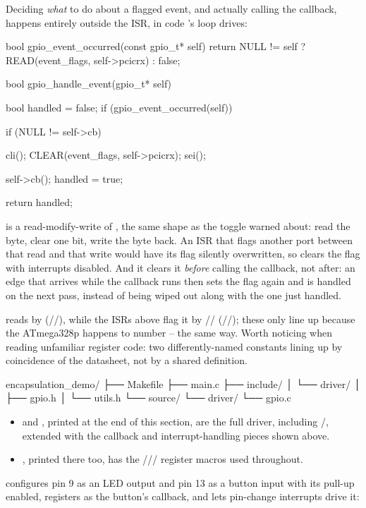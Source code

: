 \noindent Deciding \emph{what} to do about a flagged event, and actually calling the callback,
happens entirely outside the ISR, in code 's loop drives:

\begin{ccode}
bool gpio_event_occurred(const gpio_t* self)
{
    return NULL != self ? READ(event_flags, self->pcicrx) : false;
}

bool gpio_handle_event(gpio_t* self)
{
    bool handled = false;
    if (gpio_event_occurred(self))
    {
        if (NULL != self->cb)
        {
            cli();
            CLEAR(event_flags, self->pcicrx);
            sei();

            self->cb();
            handled = true;
        }
    }
    return handled;
}
\end{ccode}

\noindent{} is a read-modify-write of , the same shape as the
 toggle  warned about: read the byte, clear one bit, write the byte
back. An ISR that flags another port between that read and that write would have its flag silently
overwritten, so  clears the flag with interrupts disabled. And it clears
it \emph{before} calling the callback, not after: an edge that arrives while the callback runs then
sets the flag again and is handled on the next pass, instead of being wiped out along with the one
just handled.

 reads  by 
(//), while the ISRs above flag it by
// (//); these only line up because
the ATmega328p happens to number -- the same way. Worth noticing when
reading unfamiliar register code: two differently-named constants lining up by coincidence of the
datasheet, not by a shared definition.

\begin{console}
encapsulation_demo/
├── Makefile
├── main.c
├── include/
│   └── driver/
│       ├── gpio.h
│       └── utils.h
└── source/
    └── driver/
        └── gpio.c
\end{console}

\begin{itemize}
  \item {} and , printed at the end of this section, are the
    full driver, including /, extended with the callback and
    interrupt-handling pieces shown above.
  \item {}, printed there too, has the
    /// register macros used throughout.
\end{itemize}
 configures pin 9 as an LED output and pin 13 as a button input with its pull-up
enabled, registers  as the button's callback, and lets pin-change interrupts
drive it:

